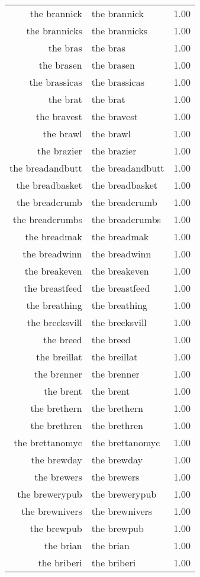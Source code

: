 \begin{table}[ht]
\begin{tabular}{rlr}
  the brannick & the brannick & 1.00 \\ 
  the brannicks & the brannicks & 1.00 \\ 
  the bras & the bras & 1.00 \\ 
  the brasen & the brasen & 1.00 \\ 
  the brassicas & the brassicas & 1.00 \\ 
  the brat & the brat & 1.00 \\ 
  the bravest & the bravest & 1.00 \\ 
  the brawl & the brawl & 1.00 \\ 
  the brazier & the brazier & 1.00 \\ 
  the breadandbutt & the breadandbutt & 1.00 \\ 
  the breadbasket & the breadbasket & 1.00 \\ 
  the breadcrumb & the breadcrumb & 1.00 \\ 
  the breadcrumbs & the breadcrumbs & 1.00 \\ 
  the breadmak & the breadmak & 1.00 \\ 
  the breadwinn & the breadwinn & 1.00 \\ 
  the breakeven & the breakeven & 1.00 \\ 
  the breastfeed & the breastfeed & 1.00 \\ 
  the breathing & the breathing & 1.00 \\ 
  the brecksvill & the brecksvill & 1.00 \\ 
  the breed & the breed & 1.00 \\ 
  the breillat & the breillat & 1.00 \\ 
  the brenner & the brenner & 1.00 \\ 
  the brent & the brent & 1.00 \\ 
  the brethern & the brethern & 1.00 \\ 
  the brethren & the brethren & 1.00 \\ 
  the brettanomyc & the brettanomyc & 1.00 \\ 
  the brewday & the brewday & 1.00 \\ 
  the brewers & the brewers & 1.00 \\ 
  the brewerypub & the brewerypub & 1.00 \\ 
  the brewnivers & the brewnivers & 1.00 \\ 
  the brewpub & the brewpub & 1.00 \\ 
  the brian & the brian & 1.00 \\ 
  the briberi & the briberi & 1.00 \\ 

\end{tabular}
\end{table}
